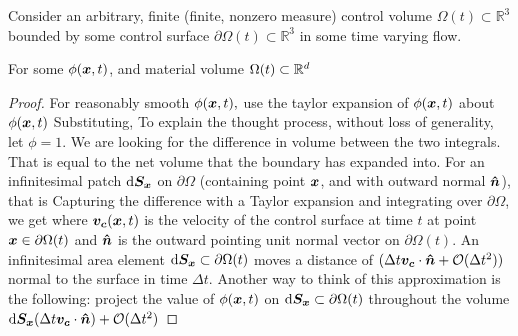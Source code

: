 Consider an arbitrary, finite (finite, nonzero measure) control volume $\Omega(t)\subset\mathbb{R}^3$ bounded by some control surface $\partial\Omega(t)\subset\mathbb{R}^3$ in some time varying flow.
\begin{theorem}
    For some $\phi(\boldsymbol{x},t)$, and material volume $\Omega(t)\subset\mathbb{R}^d$
\end{theorem}
\begin{proof}
For reasonably smooth  $\phi(\boldsymbol{x},t),$ use the taylor expansion of $\phi(\boldsymbol{x},t)$ about $\phi(\boldsymbol{x},t)$
Substituting,
To explain the thought process, without loss of generality, let $\phi=1$. We are looking for the difference in volume between the two integrals. That is equal to the net volume that the boundary has expanded into. For an infinitesimal patch $\mathrm{d} \boldsymbol{S_x}$ on $\partial\Omega$ (containing point $\boldsymbol{x}$, and with outward normal $\boldsymbol{\hat{n}}$), that is
Capturing the difference with a Taylor expansion and integrating over $\partial\Omega$, we get
where $\boldsymbol{v_c}(\boldsymbol{x},t)$ is the velocity of the control surface at time $t$ at point $\boldsymbol{x}\in\partial\Omega(t)$ and $\boldsymbol{\hat{n}}$ is the outward pointing unit normal vector on $\partial\Omega(t)$. An infinitesimal area element $\mathrm{d} \boldsymbol{S_x}\subset\partial\Omega(t)$ moves a distance of $(\Delta t\boldsymbol{v_c}\cdot\boldsymbol{\hat{n}}+\mathcal{O}(\Delta t^2))$ normal to the surface in time $\Delta t.$ Another way to think of this approximation is the following: project the value of $\phi(\boldsymbol{x},t)$ on $\mathrm{d} \boldsymbol{S_x}\subset\partial\Omega(t)$ throughout the volume $\mathrm{d} \boldsymbol{S_x}(\Delta t\boldsymbol{v_c}\cdot\boldsymbol{\hat{n}})+\mathcal{O}(\Delta t^2)$

\end{proof}
